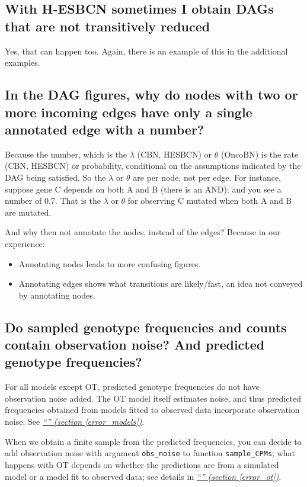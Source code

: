 \documentclass[a4paper,11pt]{article}
\newcommand*{\qref}[1]{\hyperref[{#1}]{\textit{``\nameref*{#1}'' (section \ref*{#1})}}}
\begin{document}
\subsection{With H-ESBCN sometimes I obtain DAGs that are not transitively reduced}

Yes, that can happen too. Again, there is an example of this in the additional examples.


\subsection{In the DAG figures, why do nodes with two or more incoming edges have only a single annotated edge with a number?}
\label{faq-single-num}

Because the number, which is the $\lambda$ (CBN, HESBCN) or $\theta$ (OncoBN) is the rate (CBN, HESBCN) or probability, conditional on the assumptions indicated by the DAG being satisfied. So the $\lambda$ or $\theta$ are per node, not per edge. For instance, suppose gene C depends on both A and B (there is an AND); and you see a number of 0.7. That is the $\lambda$ or $\theta$ for observing C mutated when both A and B are mutated. 


And why then not annotate the nodes, instead of the edges? Because in our experience:
\begin{itemize}
\item Annotating nodes leads to more confusing figures.
\item Annotating edges shows what transitions are likely/fast, an idea not conveyed by annotating nodes.
\end{itemize}



\subsection{Do sampled genotype frequencies and counts contain observation noise? And predicted genotype frequencies?}
\label{sec:do-sampled-genotype}

For all models except OT, predicted genotype frequencies do not have observation noise added. The OT model itself estimates noise, and thus predicted frequencies obtained from models fitted to observed data incorporate observation noise. See \qref{error_models}.

When we obtain a finite sample from the predicted frequencies, you can decide to add observation noise with argument \texttt{obs\_noise} to function \texttt{sample\_CPMs}; what happens with OT depends on whether the predictions are from a simulated model or a model fit to observed data; see details in \qref{error_ot}.
\end{document}
